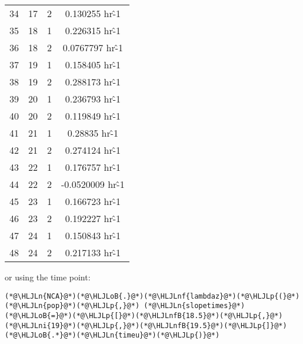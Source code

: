\documentclass[12pt,a4paper]{article}
\newcommand{\HLJLn}[1]{#1}
\newcommand{\HLJLnf}[1]{\textcolor[RGB]{66,102,213}{#1}}
\newcommand{\HLJLnfB}[1]{\textcolor[RGB]{59,151,46}{#1}}
\newcommand{\HLJLni}[1]{\textcolor[RGB]{59,151,46}{#1}}
\newcommand{\HLJLoB}[1]{\textcolor[RGB]{102,102,102}{\textbf{#1}}}
\newcommand{\HLJLp}[1]{#1}
\begin{document}
\begin{tabular}{r|ccc}
	34 & 17 & 2 & 0.130255 hr\^-1 \\
	35 & 18 & 1 & 0.226315 hr\^-1 \\
	36 & 18 & 2 & 0.0767797 hr\^-1 \\
	37 & 19 & 1 & 0.158405 hr\^-1 \\
	38 & 19 & 2 & 0.288173 hr\^-1 \\
	39 & 20 & 1 & 0.236793 hr\^-1 \\
	40 & 20 & 2 & 0.119849 hr\^-1 \\
	41 & 21 & 1 & 0.28835 hr\^-1 \\
	42 & 21 & 2 & 0.274124 hr\^-1 \\
	43 & 22 & 1 & 0.176757 hr\^-1 \\
	44 & 22 & 2 & -0.0520009 hr\^-1 \\
	45 & 23 & 1 & 0.166723 hr\^-1 \\
	46 & 23 & 2 & 0.192227 hr\^-1 \\
	47 & 24 & 1 & 0.150843 hr\^-1 \\
	48 & 24 & 2 & 0.217133 hr\^-1 \\
\end{tabular}


or using the time point:


\begin{lstlisting}
(*@\HLJLn{NCA}@*)(*@\HLJLoB{.}@*)(*@\HLJLnf{lambdaz}@*)(*@\HLJLp{(}@*)(*@\HLJLn{pop}@*)(*@\HLJLp{,}@*) (*@\HLJLn{slopetimes}@*)(*@\HLJLoB{=}@*)(*@\HLJLp{[}@*)(*@\HLJLnfB{18.5}@*)(*@\HLJLp{,}@*)(*@\HLJLni{19}@*)(*@\HLJLp{,}@*)(*@\HLJLnfB{19.5}@*)(*@\HLJLp{]}@*)(*@\HLJLoB{.*}@*)(*@\HLJLn{timeu}@*)(*@\HLJLp{)}@*)
\end{lstlisting}
\end{document}
